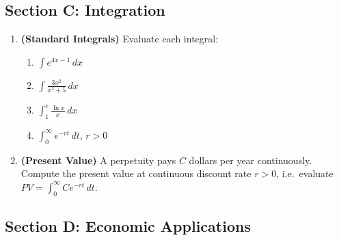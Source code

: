 \documentclass[12pt, a4paper]{article}
\theoremstyle{definition}
\newcommand{\dd}[1]{\,d#1}
\begin{document}
\subsection{Section C: Integration}

\begin{enumerate}[label=\textbf{C\arabic*.}, leftmargin=2.5em]

\item \textbf{(Standard Integrals)} Evaluate each integral:
\begin{enumerate}[label=(\alph*)]
  \item $\displaystyle\int e^{4x-1}\dd{x}$
  \item $\displaystyle\int \frac{3x^2}{x^3+5}\dd{x}$
  \item $\displaystyle\int_1^e \frac{\ln x}{x}\dd{x}$
  \item $\displaystyle\int_0^{\infty} e^{-rt}\dd{t}$, \; $r > 0$
\end{enumerate}

\item \textbf{(Present Value)} A perpetuity pays $C$ dollars per year continuously. Compute the present value at continuous discount rate $r > 0$, i.e.\ evaluate $\displaystyle PV = \int_0^\infty Ce^{-rt}\dd{t}$.

\end{enumerate}

\subsection{Section D: Economic Applications}
\end{document}
